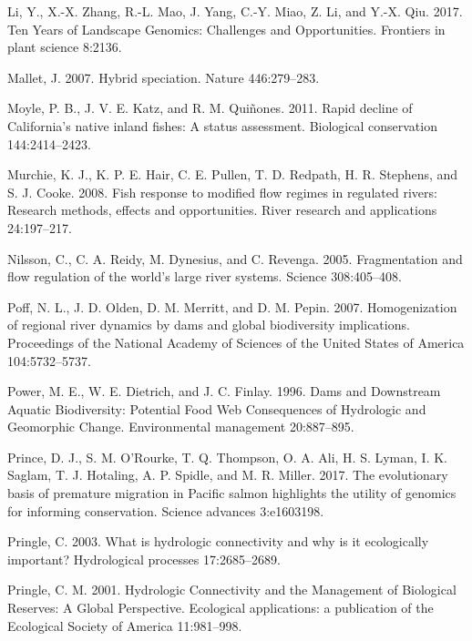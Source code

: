 \documentclass[twoside,12pt,final]{ucthesis-CA2012} %
\begin{document}
\begin{ucmainmatter}
\leavevmode\hypertarget{ref-li_ten_2017}{}%
Li, Y., X.-X. Zhang, R.-L. Mao, J. Yang, C.-Y. Miao, Z. Li, and Y.-X.
Qiu. 2017. Ten Years of Landscape Genomics: Challenges and
Opportunities. Frontiers in plant science 8:2136.

\leavevmode\hypertarget{ref-mallet_hybrid_2007}{}%
Mallet, J. 2007. Hybrid speciation. Nature 446:279--283.

\leavevmode\hypertarget{ref-moyle_rapid_2011}{}%
Moyle, P. B., J. V. E. Katz, and R. M. Quiñones. 2011. Rapid decline of
California's native inland fishes: A status assessment. Biological
conservation 144:2414--2423.

\leavevmode\hypertarget{ref-murchie_fish_2008}{}%
Murchie, K. J., K. P. E. Hair, C. E. Pullen, T. D. Redpath, H. R.
Stephens, and S. J. Cooke. 2008. Fish response to modified flow regimes
in regulated rivers: Research methods, effects and opportunities. River
research and applications 24:197--217.

\leavevmode\hypertarget{ref-nilsson_fragmentation_2005}{}%
Nilsson, C., C. A. Reidy, M. Dynesius, and C. Revenga. 2005.
Fragmentation and flow regulation of the world's large river systems.
Science 308:405--408.

\leavevmode\hypertarget{ref-poff_homogenization_2007}{}%
Poff, N. L., J. D. Olden, D. M. Merritt, and D. M. Pepin. 2007.
Homogenization of regional river dynamics by dams and global
biodiversity implications. Proceedings of the National Academy of
Sciences of the United States of America 104:5732--5737.

\leavevmode\hypertarget{ref-power_dams_1996}{}%
Power, M. E., W. E. Dietrich, and J. C. Finlay. 1996. Dams and
Downstream Aquatic Biodiversity: Potential Food Web Consequences of
Hydrologic and Geomorphic Change. Environmental management 20:887--895.

\leavevmode\hypertarget{ref-prince_evolutionary_2017}{}%
Prince, D. J., S. M. O'Rourke, T. Q. Thompson, O. A. Ali, H. S. Lyman,
I. K. Saglam, T. J. Hotaling, A. P. Spidle, and M. R. Miller. 2017. The
evolutionary basis of premature migration in Pacific salmon highlights
the utility of genomics for informing conservation. Science advances
3:e1603198.

\leavevmode\hypertarget{ref-pringle_what_2003}{}%
Pringle, C. 2003. What is hydrologic connectivity and why is it
ecologically important? Hydrological processes 17:2685--2689.

\leavevmode\hypertarget{ref-pringle_hydrologic_2001}{}%
Pringle, C. M. 2001. Hydrologic Connectivity and the Management of
Biological Reserves: A Global Perspective. Ecological applications: a
publication of the Ecological Society of America 11:981--998.


\end{ucmainmatter}
\end{document}
